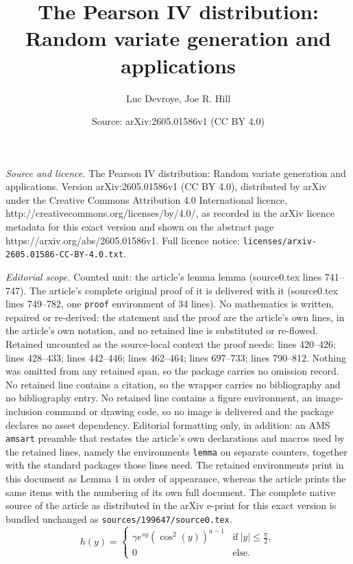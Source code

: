 \documentclass[10pt,a4paper]{amsart}
\title{The Pearson IV distribution: Random variate generation and applications}
\author{Luc Devroye, Joe R. Hill}
\date{Source: arXiv:2605.01586v1 (CC BY 4.0)}
\begin{document}
\maketitle

\noindent\emph{Source and licence.} The Pearson IV distribution: Random variate generation and applications. Version arXiv:2605.01586v1 (CC BY 4.0), distributed by arXiv under the Creative Commons Attribution 4.0 International licence, http://creativecommons.org/licenses/by/4.0/, as recorded in the arXiv licence metadata for this exact version and shown on the abstract page https://arxiv.org/abs/2605.01586v1. Full licence notice: \texttt{licenses/arxiv-2605.01586-CC-BY-4.0.txt}.\par\smallskip

\noindent\textit{Editorial scope.} Counted unit: the article's lemma lemma (source0.tex lines 741--747). The article's complete original proof of it is delivered with it (source0.tex lines 749--782, one \texttt{proof} environment of 34 lines). No mathematics is written, repaired or re-derived: the statement and the proof are the article's own lines, in the article's own notation, and no retained line is substituted or re-flowed.  Retained uncounted as the source-local context the proof needs: lines 420--426; lines 428--433; lines 442--446; lines 462--464; lines 697--733; lines 790--812.  Nothing was omitted from any retained span, so the package carries no omission record.  No retained line contains a citation, so the wrapper carries no bibliography and no bibliography entry.  No retained line contains a figure environment, an image-inclusion command or drawing code, so no image is delivered and the package declares no asset dependency.  Editorial formatting only, in addition: an AMS \texttt{amsart} preamble that restates the article's own declarations and macros used by the retained lines, namely the environments \texttt{lemma} on separate counters, together with the standard packages those lines need.  The retained environments print in this document as Lemma 1 in order of appearance, whereas the article prints the same items with the numbering of its own full document.  The complete native source of the article as distributed in the arXiv e-print for this exact version is bundled unchanged as \texttt{sources/199647/source0.tex}.
\begin{equation}\label{atan}
h(y) =  
\begin{cases}
\gamma e^{sy} ( \cos^2 (y) )^{a-1} & \text{if} ~|y| \le \frac{\pi }{ 2}, \\
0 & \text{else.} 
\end{cases}
\end{equation}
\end{document}
